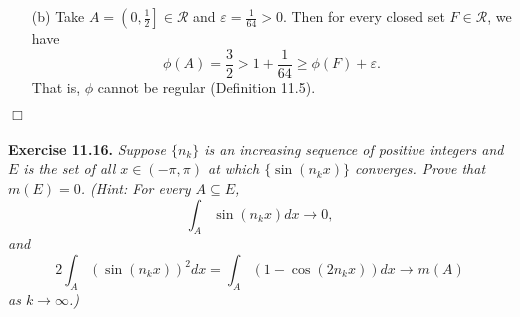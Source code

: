 \documentclass{article}
\begin{document}
\begin{enumerate}
\begin{enumerate}
  \item[(b)]
    Take $A = \left(0,\frac{1}{2}\right] \in \mathscr{R}$
    and $\varepsilon = \frac{1}{64} > 0$.
    Then for every closed set $F \in \mathscr{R}$,
    we have
    \[
      \phi(A) = \frac{3}{2} > 1 + \frac{1}{64} \geq \phi(F) + \varepsilon.
    \]
    That is, $\phi$ cannot be regular (Definition 11.5).
  \end{enumerate}
\end{enumerate}
$\Box$ \\\\






\textbf{Exercise 11.16.}
\emph{Suppose $\{n_k\}$ is an increasing sequence of positive integers and
$E$ is the set of all $x \in (-\pi,\pi)$ at which $\{ \sin(n_k x) \}$ converges.
Prove that $m(E) = 0$.
(Hint: For every $A \subseteq E$,
\[
  \int_A \sin(n_k x) dx \to 0,
\]
and
\[
  2 \int_A (\sin(n_k x))^2 dx = \int_A (1-\cos(2n_k x)) dx \to m(A)
\]
as $k \to \infty$.)} \\
\end{document}
